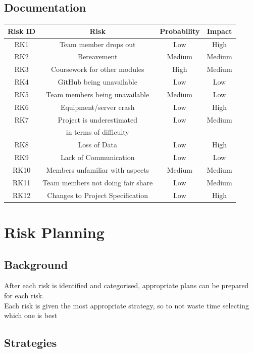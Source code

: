 \documentclass[11pt, a4paper]{report}
\begin{document}
\subsection{Documentation}

\begin{tabular}{|c|c|c|c|}
	\hline
	\textbf{Risk ID} & \textbf{Risk} & \textbf{Probability} & \textbf{Impact} \\
	\hline
	RK1 & Team member drops out & Low & High \\
	\hline
	RK2 & Bereavement & Medium & Medium \\
	\hline
	RK3 & Coursework for other modules & High & Medium \\
	\hline
	RK4 & GitHub being unavailable & Low & Low \\
	\hline
	RK5 & Team members being unavailable & Medium & Low \\
	\hline
	RK6 & Equipment/server crash & Low & High \\
	\hline
	RK7 & Project is underestimated & Low & Medium \\ 
	&in terms of difficulty &&\\
	\hline
	RK8 & Loss of Data & Low & High \\
	\hline
	RK9 & Lack of Communication & Low & Low \\
	\hline
	RK10 & Members unfamiliar with aspects & Medium & Medium \\
	\hline
	RK11 & Team members not doing fair share & Low & Medium \\
	\hline
	RK12 & Changes to Project Specification & Low & High \\
	\hline
	
\end{tabular}

\section{Risk Planning}

\subsection{Background}

After each risk is identified and categorised, appropriate plans can be prepared for each risk.\\

\noindent Each risk is given the most appropriate strategy, so to not waste time selecting which one is best

\subsection{Strategies}
\end{document}
